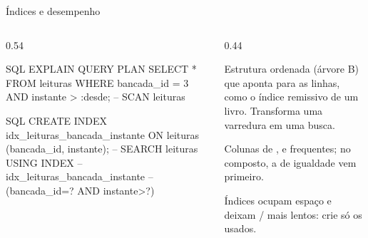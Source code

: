 \documentclass[aspectratio=169,10pt]{beamer}
\begin{document}
\begin{frame}[fragile]{Índices e desempenho}
  \begin{columns}[T]
    \begin{column}{0.54\textwidth}
\begin{codigo}[title=Sem índice: varre a tabela inteira]{SQL}
EXPLAIN QUERY PLAN
SELECT * FROM leituras
WHERE  bancada_id = 3 AND instante > :desde;
-- SCAN leituras
\end{codigo}
\begin{codigo}[title=Com índice composto: busca direta]{SQL}
CREATE INDEX idx_leituras_bancada_instante
  ON leituras (bancada_id, instante);
-- SEARCH leituras USING INDEX
--   idx_leituras_bancada_instante
--   (bancada_id=? AND instante>?)
\end{codigo}
    \end{column}
    \begin{column}{0.44\textwidth}
      \begin{conceito}[Índice]
        Estrutura ordenada (árvore B) que aponta para as linhas, como o índice remissivo de um livro. Transforma uma varredura em uma busca.
      \end{conceito}
      \begin{dica}
        Colunas de ,  e  frequentes; no composto, a de igualdade vem primeiro.
      \end{dica}
      \begin{atencao}
        Índices ocupam espaço e deixam / mais lentos: crie só os usados.
      \end{atencao}
    \end{column}
  \end{columns}
\end{frame}
\end{document}
